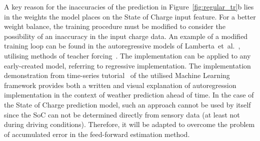 %
%
A key reason for the inaccuracies of the prediction in \mbox{Figure~\ref{fig:regular_tr}b} lies in the weights the model places on the State of Charge input feature.
For a better weight balance, the training procedure must be modified to consider the possibility of an inaccuracy in the input charge data.
An example of a modified training loop can be found in the autoregressive models of \mbox{Lamberta et al.~\cite{time_2020}}, utilising methods of teacher forcing~\cite{brownlee_what_2017,orac_lstm_2024}.
The implementation can be applied to any early-created model, referring to regressive implementation.
The implementation demonstration from time-series tutorial~\cite{time_2020} of the utilised Machine Learning framework provides both a written and visual explanation of autoregression implementation in the context of weather prediction ahead of time.
In the case of the State of Charge prediction model, such an approach cannot be used by itself since the SoC can not be determined directly from sensory data (at least not during driving conditions).
Therefore, it will be adapted to overcome the problem of accumulated error in the feed-forward estimation method.

